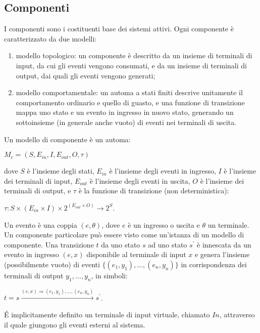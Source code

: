 \subsection{Componenti} 
I componenti sono i costituenti base dei sistemi attivi. Ogni componente è caratterizzato da due modelli:
\begin{enumerate}
\item modello topologico: un componente è descritto da un insieme di terminali di input, da cui gli eventi vengono consumati, e da un insieme di terminali di output, dai quali gli eventi vengono generati;
\item modello comportamentale: un automa a stati finiti descrive unitamente il comportamento ordinario e quello di guasto, e una funzione di transizione mappa uno stato e un evento in ingresso in nuovo stato, generando un sottoinsieme (in generale anche vuoto) di eventi nei terminali di uscita.  
\end{enumerate}

\begin{defn}
Un modello di componente è un automa:
\begin{center}
	$M_c = (S,E_{in},I,E_{out},O,\tau)$
\end{center}
dove $S$ è l'insieme degli stati, $E_{in}$ è l'insieme degli eventi in ingresso, $I$ è l'insieme dei terminali di input, $E_{out}$ è l'insieme degli eventi in uscita, $O$ è l'insieme dei terminali di output, e $\tau$ è la funzione di transizione (non deterministica):
\begin{center}
	$ \tau : S \times (E_{in} \times I) \times 2^{(E_{out} \times O)} \rightarrow 2^S $.
\end{center}

Un evento è una coppia $(e,\theta)$, dove $e$ è un ingresso o uscita e $\theta$ un terminale. Un componente particolare può essere visto come un'istanza di un modello di componente. 
Una transizione $t$ da uno stato $s$ ad uno stato $s^\prime$ è innescata da un evento in ingresso $(e,x)$ disponibile al terminale di input $x$ e genera l'insieme (possibilmente vuoto) di eventi 
$\{(e_1,y_1), \ldots ,(e_n,y_n)\}$ in corrispondenza dei terminali di output $y_1, \ldots,y_n$, in simboli:
\begin{center}
	$t = s \xrightarrow {(e,x) \Rightarrow (e_1,y_1), \ldots ,(e_n,y_n)} s^{\prime}$.
\end{center}
\end{defn}

\'E implicitamente definito un terminale di input virtuale, chiamato $In$, attraverso il quale giungono gli eventi esterni al sistema.

